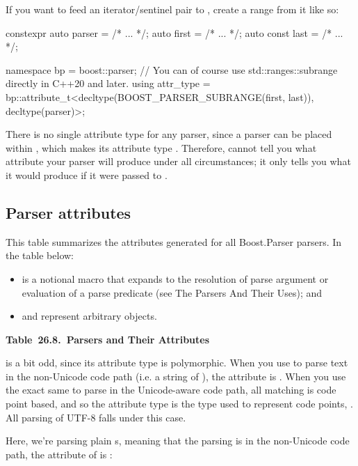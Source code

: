 \documentclass{MyBook}
\begin{document}
If you want to feed an iterator/sentinel pair to , create a range from it like so:

\begin{code}
constexpr auto parser = /* ... */;
auto first = /* ... */;
auto const last = /* ... */;

namespace bp = boost::parser;
// You can of course use std::ranges::subrange directly in C++20 and later.
using attr_type = bp::attribute_t<decltype(BOOST_PARSER_SUBRANGE(first, last)), decltype(parser)>;
\end{code}

There is no single attribute type for any parser, since a parser can be placed within , which makes its attribute type . Therefore,  cannot tell you what attribute your parser will produce under all circumstances; it only tells you what it would produce if it were passed to .

\subsection{Parser attributes}

This table summarizes the attributes generated for all Boost.Parser parsers. In the table below:

\begin{itemize}
\item
  \emph{}\ci{()} is a notional macro that expands to the resolution of parse argument or evaluation of a parse predicate (see The Parsers And Their Uses); and
\item
   and  represent arbitrary objects.
\end{itemize}

\textbf{Table~26.8.~Parsers and Their Attributes}



\hfill\break

 is a bit odd, since its attribute type is polymorphic. When you use  to parse text in the non-Unicode code path (i.e. a string of ), the attribute is . When you use the exact same  to parse in the Unicode-aware code path, all matching is code point based, and so the attribute type is the type used to represent code points, . All parsing of UTF-8 falls under this case.

Here, we're parsing plain s, meaning that the parsing is in the non-Unicode code path, the attribute of  is :
\end{document}
